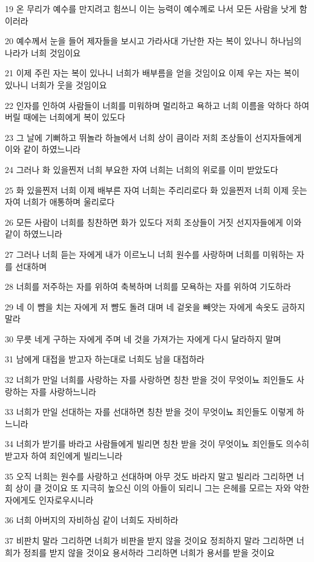 \par 19 온 무리가 예수를 만지려고 힘쓰니 이는 능력이 예수께로 나서 모든 사람을 낫게 함이러라
\par 20 예수께서 눈을 들어 제자들을 보시고 가라사대 가난한 자는 복이 있나니 하나님의 나라가 너희 것임이요
\par 21 이제 주린 자는 복이 있나니 너희가 배부름을 얻을 것임이요 이제 우는 자는 복이 있나니 너희가 웃을 것임이요
\par 22 인자를 인하여 사람들이 너희를 미워하며 멀리하고 욕하고 너희 이름을 악하다 하여 버릴 때에는 너희에게 복이 있도다
\par 23 그 날에 기뻐하고 뛰놀라 하늘에서 너희 상이 큼이라 저희 조상들이 선지자들에게 이와 같이 하였느니라
\par 24 그러나 화 있을찐저 너희 부요한 자여 너희는 너희의 위로를 이미 받았도다
\par 25 화 있을찐저 너희 이제 배부른 자여 너희는 주리리로다 화 있을찐저 너희 이제 웃는 자여 너희가 애통하며 울리로다
\par 26 모든 사람이 너희를 칭찬하면 화가 있도다 저희 조상들이 거짓 선지자들에게 이와 같이 하였느니라
\par 27 그러나 너희 듣는 자에게 내가 이르노니 너희 원수를 사랑하며 너희를 미워하는 자를 선대하며
\par 28 너희를 저주하는 자를 위하여 축복하며 너희를 모욕하는 자를 위하여 기도하라
\par 29 네 이 뺨을 치는 자에게 저 뺨도 돌려 대며 네 겉옷을 빼앗는 자에게 속옷도 금하지 말라
\par 30 무릇 네게 구하는 자에게 주며 네 것을 가져가는 자에게 다시 달라하지 말며
\par 31 남에게 대접을 받고자 하는대로 너희도 남을 대접하라
\par 32 너희가 만일 너희를 사랑하는 자를 사랑하면 칭찬 받을 것이 무엇이뇨 죄인들도 사랑하는 자를 사랑하느니라
\par 33 너희가 만일 선대하는 자를 선대하면 칭찬 받을 것이 무엇이뇨 죄인들도 이렇게 하느니라
\par 34 너희가 받기를 바라고 사람들에게 빌리면 칭찬 받을 것이 무엇이뇨 죄인들도 의수히 받고자 하여 죄인에게 빌리느니라
\par 35 오직 너희는 원수를 사랑하고 선대하며 아무 것도 바라지 말고 빌리라 그리하면 너희 상이 클 것이요 또 지극히 높으신 이의 아들이 되리니 그는 은헤를 모르는 자와 악한 자에게도 인자로우시니라
\par 36 너희 아버지의 자비하심 같이 너희도 자비하라
\par 37 비판치 말라 그리하면 너희가 비판을 받지 않을 것이요 정죄하지 말라 그리하면 너희가 정죄를 받지 않을 것이요 용서하라 그리하면 너희가 용서를 받을 것이요
